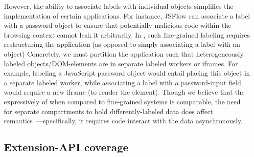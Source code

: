 
However, the ability to associate labels with individual objects
simplifies the implementation of certain applications. 
%
For instance, JSFlow can associate a label with a password object
to ensure that potentially malicious code within the browsing context
cannot leak it arbitrarily.
%
In \sys{}, such fine-grained labeling requires restructuring the
application (as opposed to simply associating a label with an object)
%
Concretely, we must partition the application such that
heterogeneously labeled objects/DOM-elements are in separate labeled
workers or iframes.
%
For example, labeling a JavaScript password object would entail
placing this object in a separate labeled worker, while associating a
label with a password-input field would require a new iframe (to
render the element).
%
Though we believe that the expressively of \sys{} when compared to
fine-grained systems is comparable, the need for separate compartments
to hold differently-labeled data does affect
semantics~\cite{Ingram:2012}---specifically, it requires code interact
with the data asynchronously.

\subsection{Extension-API coverage}
\label{sec:discussion:extension}




